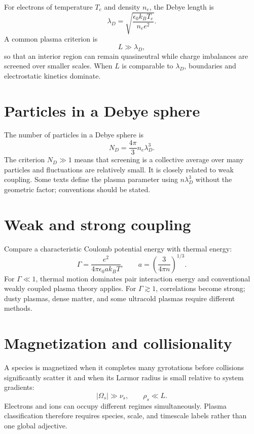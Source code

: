 \documentclass[11pt]{article}
\begin{document}
For electrons of temperature $T_e$ and density $n_e$, the Debye length is
\begin{equation}
\lambda_D=\sqrt{\frac{\epsilon_0 k_BT_e}{n_ee^2}}.
\end{equation}
A common plasma criterion is
\begin{equation}
L\gg\lambda_D,
\end{equation}
so that an interior region can remain quasineutral while charge imbalances are screened over smaller scales. When $L$ is comparable to $\lambda_D$, boundaries and electrostatic kinetics dominate.


\section{Particles in a Debye sphere}

The number of particles in a Debye sphere is
\begin{equation}
N_D=\frac{4\pi}{3}n_e\lambda_D^3.
\end{equation}
The criterion $N_D\gg1$ means that screening is a collective average over many particles and fluctuations are relatively small. It is closely related to weak coupling. Some texts define the plasma parameter using $n\lambda_D^3$ without the geometric factor; conventions should be stated.


\section{Weak and strong coupling}

Compare a characteristic Coulomb potential energy with thermal energy:
\begin{equation}
\Gamma=\frac{e^2}{4\pi\epsilon_0 a k_BT},\qquad
a=\left(\frac{3}{4\pi n}\right)^{1/3}.
\end{equation}
For $\Gamma\ll1$, thermal motion dominates pair interaction energy and conventional weakly coupled plasma theory applies. For $\Gamma\gtrsim1$, correlations become strong; dusty plasmas, dense matter, and some ultracold plasmas require different methods.


\section{Magnetization and collisionality}

A species is magnetized when it completes many gyrotations before collisions significantly scatter it and when its Larmor radius is small relative to system gradients:
\begin{equation}
|\Omega_s|\gg\nu_s,\qquad \rho_s\ll L.
\end{equation}
Electrons and ions can occupy different regimes simultaneously. Plasma classification therefore requires species, scale, and timescale labels rather than one global adjective.
\end{document}

